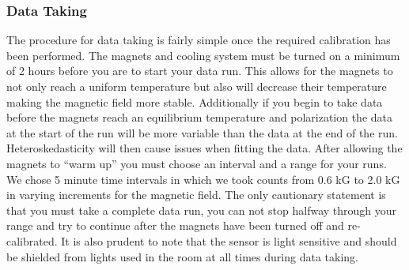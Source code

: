 \subsubsection{Data Taking}

The procedure for data taking is fairly simple once the required calibration has been performed.  The magnets and cooling system must be turned on a minimum of 2 hours before you are to start your data run.  This allows for the magnets to not only reach a uniform temperature but also will decrease their temperature making the magnetic field more stable. Additionally if you begin to take data before the magnets reach an equilibrium temperature and polarization the data at the start of the run will be more variable than the data at the end of the run. Heteroskedasticity will then cause issues when fitting the data. After allowing the magnets to ``warm up'' you must choose an interval and a range for your runs.  We chose 5 minute time intervals in which we took counts from 0.6 kG to 2.0 kG in varying increments for the magnetic field.  The only cautionary statement is that you must take a complete data run, you can not stop halfway through your range and try to continue after the magnets have been turned off and re-calibrated. It is also prudent to note that the sensor is light sensitive and should be shielded from lights used in the room at all times during data taking. 

